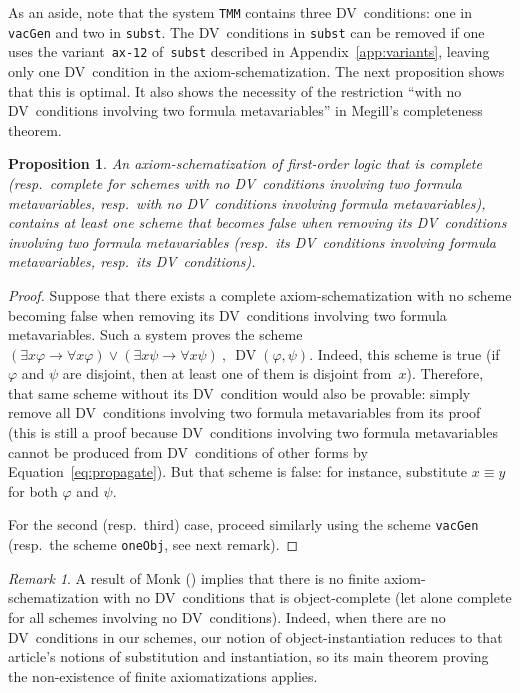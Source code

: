 \documentclass[11pt]{article}
\newcommand*{\comma}{\:,\:}
\renewcommand*{\phi}{\varphi}
\DeclareMathOperator{\DV}{DV}
\theoremstyle{plain}
\newtheorem{proposition}[theorem]{Proposition}
\theoremstyle{definition}
\theoremstyle{remark}
\newtheorem{remark}[theorem]{Remark}
\begin{document}
As an aside, note that the system \texttt{TMM} contains three DV~conditions: one in \texttt{vacGen}
and two in \texttt{subst}. The DV~conditions in \texttt{subst} can be removed if one uses the
variant~\texttt{ax-12} of~\texttt{subst} described in Appendix~\ref{app:variants}, leaving only one
DV~condition in the axiom-schematization. The next proposition shows that this is optimal. It also
shows the necessity of the restriction ``with no DV~conditions involving two formula metavariables''
in Megill's completeness theorem.

\begin{proposition}\label{prop:dv}
An axiom-schematization of first-order logic that is complete (resp.\ complete for schemes with no
DV~conditions involving two formula metavariables, resp.\ with no DV~conditions involving formula
metavariables), contains at least one scheme that becomes false when removing its DV~conditions
involving two formula metavariables (resp.\ its DV~conditions involving formula metavariables,
resp.\ its DV~conditions).
\end{proposition}

\begin{proof}
Suppose that there exists a complete axiom-schematization with no scheme becoming false when
removing its DV~conditions involving two formula metavariables.
Such a system proves the scheme
$(\exists x \phi \to \forall x \phi) \vee (\exists x \psi \to \forall x \psi) \comma \DV(\phi, \psi)$.
Indeed, this scheme is true (if $\phi$ and $\psi$ are disjoint, then at least one of them is
disjoint from~$x$).
Therefore, that same scheme without its DV~condition would also be provable: simply remove all
DV~conditions involving two formula  metavariables from its proof (this is still a proof because
DV~conditions involving two formula metavariables cannot be produced from DV~conditions of other
forms by Equation~\eqref{eq:propagate}).
But that scheme is false: for instance, substitute $x\equiv y$ for both $\phi$ and $\psi$.

For the second (resp.\ third) case, proceed similarly using the scheme \texttt{vacGen}
(resp.\ the scheme \texttt{oneObj}, see next remark).
\end{proof}

\begin{remark}
A result of Monk (\cite{monk2}) implies that there is no finite axiom-schematization with no
DV~conditions that is object-complete (let alone complete for all schemes involving no DV~conditions).
Indeed, when there are no DV~conditions in our schemes, our notion of object-instantiation reduces
to that article's notions of substitution and instantiation, so its main theorem proving the
non-existence of finite axiomatizations applies.
\end{remark}
\end{document}
